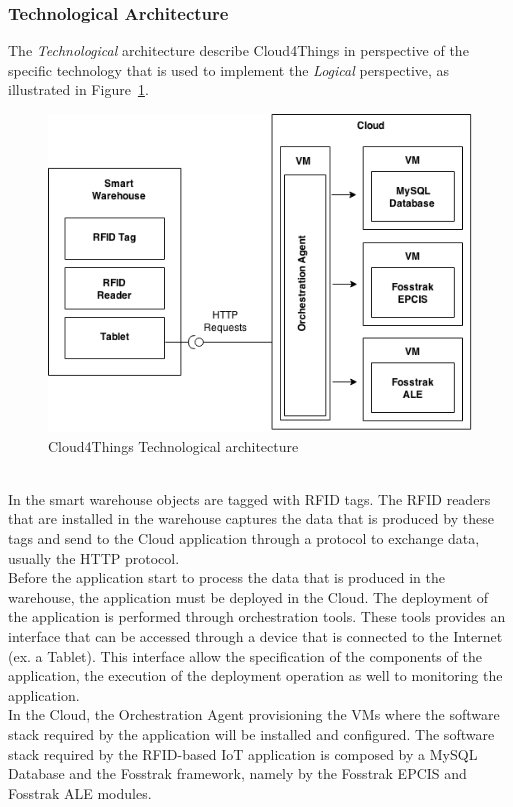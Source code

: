 \subsubsection{Technological Architecture}
\label{subs:technological_architecture}
The \textit{Technological} architecture describe Cloud4Things in perspective of the
specific technology that is used to implement the \textit{Logical} perspective, as
illustrated in Figure~\ref{fig:technological_architecture}.
\begin{figure}[h!]
  \centering
  \includegraphics[width=.8\textwidth]{./images/technological-architecture}
  \caption{Cloud4Things Technological architecture}
  \label{fig:technological_architecture}
\end{figure}\\
In the smart warehouse objects are tagged with RFID tags. The RFID readers that
are installed in the warehouse captures the data that is produced by these tags
and send to the Cloud application through a protocol to exchange data, usually
the HTTP protocol.\\

Before the application start to process the data that is produced in the warehouse,
the application must be deployed in the Cloud. The deployment of the application is
performed through orchestration tools. These tools provides an interface that can be
accessed through a device that is connected to the Internet (ex. a Tablet). This interface
allow the specification of the components of the application, the execution of the deployment
operation as well to monitoring the application.\\

In the Cloud, the Orchestration Agent provisioning the VMs where the software stack required
by the application will be installed and configured. The software stack required by the
RFID-based IoT application is composed by a MySQL Database and the Fosstrak framework,
namely by the Fosstrak EPCIS and Fosstrak ALE modules.\\
